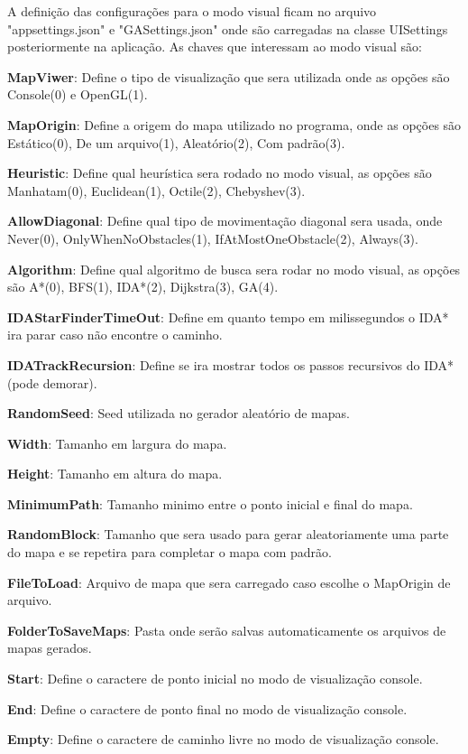  
 A definição das configurações para o modo visual ficam no arquivo "appsettings.json" e "GASettings.json" onde são carregadas na classe UISettings posteriormente na aplicação. As chaves que interessam ao modo visual são:
 
 
 \textbf{MapViwer}: Define o tipo de visualização que sera utilizada onde as opções são Console(0) e OpenGL(1).
 
 \textbf{MapOrigin}: Define a origem do mapa utilizado no programa, onde as opções são Estático(0), De um arquivo(1), Aleatório(2), Com padrão(3).
 
 \textbf{Heuristic}: Define qual heurística sera rodado no modo visual, as opções são Manhatam(0), Euclidean(1), Octile(2), Chebyshev(3).
 
 \textbf{AllowDiagonal}: Define qual tipo de movimentação diagonal sera usada, onde Never(0), OnlyWhenNoObstacles(1), IfAtMostOneObstacle(2), Always(3).
 
 \textbf{Algorithm}: Define qual algoritmo de busca sera rodar no modo visual, as opções são  A\**(0), BFS(1), IDA\**(2), Dijkstra(3), GA(4).
 
 \textbf{IDAStarFinderTimeOut}: Define em quanto tempo em milissegundos o IDA\** ira parar caso não encontre o caminho.
 
 \textbf{IDATrackRecursion}: Define se ira mostrar todos os passos recursivos do IDA\** (pode demorar).
 
 \textbf{RandomSeed}: Seed utilizada no gerador aleatório de mapas.
 
 \textbf{Width}: Tamanho em largura do mapa.
 
 \textbf{Height}: Tamanho em altura do mapa.
 
 \textbf{MinimumPath}: Tamanho minimo entre o ponto inicial e final do mapa.
 
 \textbf{RandomBlock}: Tamanho que sera usado para gerar aleatoriamente uma parte do mapa e se repetira para completar o mapa com padrão.
 
 \textbf{FileToLoad}: Arquivo de mapa que sera carregado caso escolhe o MapOrigin de arquivo.
 
 \textbf{FolderToSaveMaps}: Pasta onde serão salvas automaticamente os arquivos de mapas gerados.
 
 \textbf{Start}: Define o caractere de ponto inicial no modo de visualização console.
 
 \textbf{End}: Define o caractere de ponto final no modo de visualização console.
 
 \textbf{Empty}: Define o caractere de caminho livre no modo de visualização console.
 
